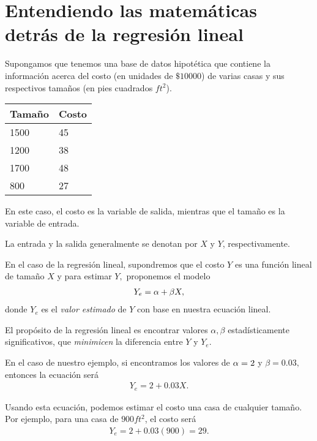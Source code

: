 \section{Entendiendo las matemáticas detrás de la regresión lineal}

Supongamos que tenemos una base de datos hipotética que contiene la información acerca del costo (en unidades de $\$10000$) de varias casas y sus respectivos tamaños (en pies cuadrados $ft^{2}$).


\begin{center}
	\begin{tabular}{|l|l|}\hline
		Tamaño & Costo\\\hline
		1500 & 45\\\hline
		1200 & 38\\\hline
		1700 & 48\\\hline
		800 & 27\\\hline
	\end{tabular}
\end{center}



En este caso, el costo es la variable de salida, mientras que el tamaño es la variable de entrada. 

La entrada y la salida generalmente se denotan por $X$ y $Y$, respectivamente.


En el caso de la regresión lineal, supondremos que el costo $Y$ es una función lineal de tamaño $X$ y para estimar $Y,$ proponemos el modelo \begin{align}
	Y_{e} = \alpha + \beta X ,
\end{align}
donde $Y_{e}$ es el \emph{valor estimado} de $Y$ con base en nuestra ecuación lineal.


\begin{observacion}
	El propósito de la regresión lineal es encontrar valores $\alpha, \beta$ estadísticamente significativos, que \emph{minimicen} la diferencia entre $Y$ y $Y_{e}.$
\end{observacion}



En el caso de nuestro ejemplo, si encontramos los valores de $\alpha=2$ y $\beta=0.03,$ entonces la ecuación será
\begin{align}
	Y_{e}= 2 + 0.03 X.
\end{align}


Usando esta ecuación, podemos estimar el costo una casa de cualquier tamaño.  Por ejemplo, para una casa de $900 ft^{2}$, el costo será
\begin{align}
	Y_{e}= 2 + 0.03(900)= 29 .
\end{align}



